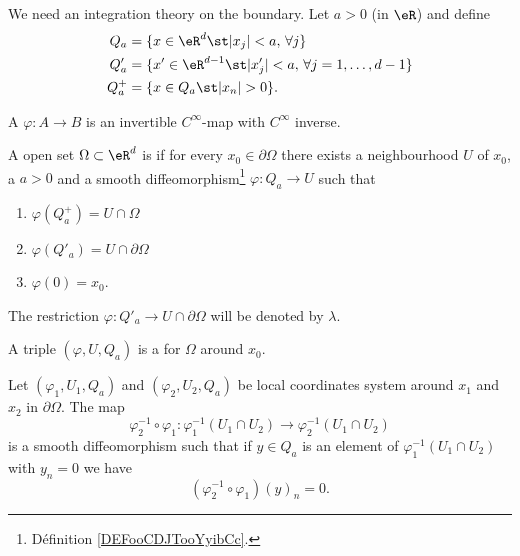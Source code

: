 We need an integration theory on the boundary. Let \( a>0\) (in \( \eR\)) and define
\begin{subequations}
    \begin{align}
        Q_a&=\{ x\in \eR^{d}\st | x_j |<a,\,\forall j \}\\
        Q'_a&=\{ x'\in \eR^{d-1}\st | x'_j |<a,\,\forall j=1,\ldots, d-1 \}\\
        Q^+_a&=\{ x\in Q_a\st | x_n |>0\}.
    \end{align}
\end{subequations}

\begin{definition}          \label{DEFooCDJTooYyibCc}
    A  \( \varphi\colon A\to B\) is an invertible \(  C^{\infty}\)-map with \(  C^{\infty}\) inverse.
\end{definition}

\begin{definition}
    A open set \( \Omega\subset \eR^d\) is  if for every \( x_0\in \partial\Omega\) there exists a neighbourhood \( U\) of \( x_0\), a \( a>0\) and a smooth diffeomorphism\footnote{Définition \ref{DEFooCDJTooYyibCc}.} \( \varphi\colon Q_a\to U\) such that
    \begin{enumerate}
        \item
            \( \varphi(Q_a^+)=U\cap\Omega\)
        \item
            \( \varphi(Q'_a)=U\cap\partial\Omega\)
        \item
            \( \varphi(0)=x_0\).
    \end{enumerate}
\end{definition}
The restriction \( \varphi\colon Q'_a\to U\cap\partial\Omega\) will be denoted by \( \lambda\).

\begin{definition}
    A triple \( (\varphi,U,Q_a)\) is a  for \( \Omega\) around \( x_0\).
\end{definition}

\begin{lemma}
    Let \( (\varphi_1,U_1,Q_a)\) and \( (\varphi_2,U_2,Q_a)\) be local coordinates system around \( x_1\) and \( x_2\) in \( \partial\Omega\). The map
    \begin{equation}
        \varphi_2^{-1}\circ\varphi_1\colon \varphi_1^{-1}(U_1\cap U_2)\to \varphi_2^{-1}(U_1\cap U_2)
    \end{equation}
    is a smooth diffeomorphism such that if \( y\in Q_a\) is an element of \( \varphi_1^{-1}(U_1\cap U_2)\) with \( y_n=0\) we have
    \begin{equation}
        (\varphi_2^{-1}\circ\varphi_1)(y)_n=0.
    \end{equation}
\end{lemma}

